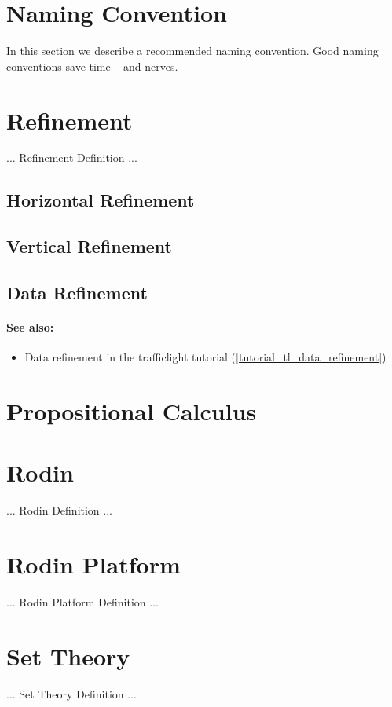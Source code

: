 \section{Naming Convention}
\label{naming_convention}

In this section we describe a recommended naming convention.  Good naming conventions save time -- and nerves.

\section{Refinement}
\label{refinement}

... Refinement Definition ...

\subsection{Horizontal Refinement}
\label{horizontal_refinement}

\subsection{Vertical Refinement}
\label{vertical_refinement}

\subsection{Data Refinement}
\label{data_refinement}

\paragraph*{See also:}
\begin{itemize}
\item Data refinement in the trafficlight tutorial (\ref{tutorial_tl_data_refinement})
\end{itemize}

\section{Propositional Calculus}
\label{propositional_calculus}

\section{Rodin}
\label{rodin}

... Rodin Definition ...

\section{Rodin Platform}
\label{rodin_platform}

... Rodin Platform Definition ...

\section{Set Theory}
\label{set_theory}

... Set Theory Definition ...



